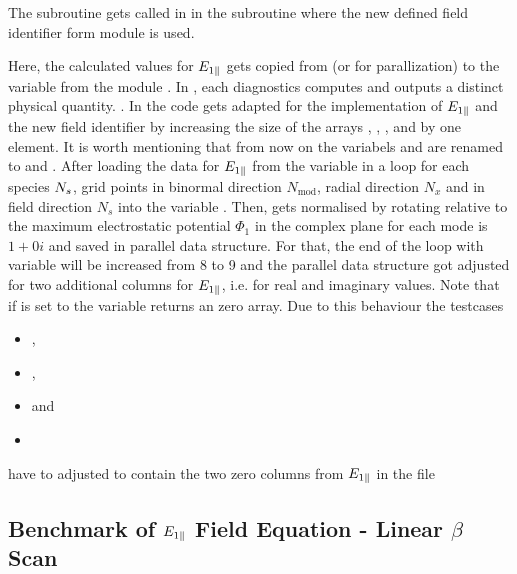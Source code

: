 The subroutine  gets called in  in the subroutine  where the new defined field identifier  form module  is used. 

Here, the calculated values for $E_{1\parallel}$ gets copied from  (or  for parallization) to the variable  from the module . In \gkw, each diagnostics computes and outputs a distinct physical quantity. \cite{GKWManual}. In  the code gets adapted for the implementation of $E_{1\parallel}$ and the new field identifier  by increasing the size of the arrays , , ,  and  by one element. It is worth mentioning that from now on the variabels  and  are renamed to  and . After loading the data for $E_{1\parallel}$ from the variable  in a loop for each species $N_s$, grid points in binormal direction $N_\mathrm{mod}$, radial direction $N_x$ and in field direction $N_s$ into the variable . Then,  gets normalised by rotating relative to the maximum electrostatic potential $\Phi_1$ in the complex plane for each mode is $1 + 0i$ and saved in parallel data structure. For that, the end of the loop with variable  will be increased from 8 to 9 and the parallel data structure got adjusted for two additional columns for $E_{1\parallel}$, i.e. for real and imaginary values. Note that if  is set to  the variable  returns an zero array. Due to this behaviour the testcases 
\begin{itemize}
    \item {},
    \item {},
    \item {} and
    \item {}
\end{itemize}
have to adjusted to contain the two zero columns from $E_{1\parallel}$ in the file 

\subsection{Benchmark of $E_{1\parallel}$ Field Equation - Linear $\beta$ Scan}
\label{sub:benchmarkFieldEpar}

